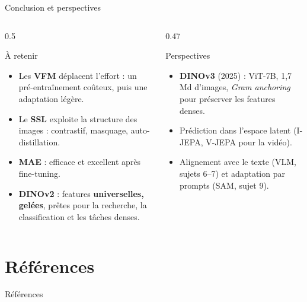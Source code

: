 \documentclass[aspectratio=169,10pt]{beamer}
\newcommand{\src}[1]{\par\vfill\hfill{\tiny\color{grisE}#1}}
\begin{document}
\begin{frame}{Conclusion et perspectives}
  \begin{columns}[T]
    \begin{column}{0.5\textwidth}
      \begin{block}{À retenir}
        \small
        \begin{itemize}
          \setlength{\itemsep}{1mm}
          \item Les \textbf{VFM} déplacent l'effort : un pré-entraînement coûteux, puis une adaptation légère.
          \item Le \textbf{SSL} exploite la structure des images : contrastif, masquage, auto-distillation.
          \item \textbf{MAE} : efficace et excellent après fine-tuning.
          \item \textbf{DINOv2} : features \textbf{universelles, gelées}, prêtes pour la recherche, la classification et les tâches denses.
        \end{itemize}
      \end{block}
    \end{column}
    \begin{column}{0.47\textwidth}
      \begin{exampleblock}{Perspectives}
        \small
        \begin{itemize}
          \setlength{\itemsep}{1mm}
          \item \textbf{DINOv3} (2025) : ViT-7B, 1,7 Md d'images, \textit{Gram anchoring} pour préserver les features denses.
          \item Prédiction dans l'espace latent (I-JEPA, V-JEPA pour la vidéo).
          \item Alignement avec le texte (VLM, sujets 6--7) et adaptation par prompts (SAM, sujet 9).
        \end{itemize}
      \end{exampleblock}
    \end{column}
  \end{columns}
  \src{\citet{simeoni2025dinov3,assran2023ijepa,kirillov2023sam}}
\end{frame}

\section{Références}
\begin{frame}[allowframebreaks]{Références}
  \tiny
  
  
\end{frame}
\end{document}
